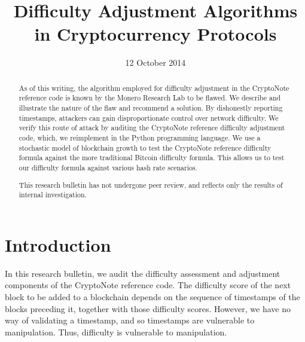\documentclass[12pt,english]{mrl}
\theoremstyle{definition}
\numberwithin{equation}{section}
\numberwithin{figure}{section}
\numberwithin{equation}{section}
\numberwithin{equation}{section}
\numberwithin{figure}{section}
\begin{document}
\begin{frontmatter}

\begin{fmbox}
\hfill\setlength{\fboxrule}{0px}\setlength{\fboxsep}{5px}
\title{Difficulty Adjustment Algorithms in Cryptocurrency Protocols}
\date{12 October 2014}
\author[
   addressref={mrl},
   email={lab@monero.cc}
]{ }
\author[
   addressref={mrl}
   email={lab@monero.cc}
]{ }


\address[id=mrl]{
}
\end{fmbox}

\begin{abstractbox}
\begin{abstract}
As of this writing, the algorithm employed for difficulty adjustment in the CryptoNote reference code is known by the Monero Research Lab to be flawed. We describe and illustrate the nature of the flaw and recommend a solution. By dishonestly reporting timestamps, attackers can gain disproportionate control over network difficulty.  We verify this route of attack by auditing the CryptoNote reference difficulty adjustment code, which, we reimplement in the Python programming language.  We use a stochastic model of blockchain growth to test the CryptoNote reference difficulty formula against the more traditional Bitcoin difficulty formula. This allows us to test our difficulty formula against various hash rate scenarios.

This research bulletin has not undergone peer review, and reflects only the results of internal investigation.
\end{abstract}
\end{abstractbox}
\end{frontmatter}

\section{Introduction}\label{intro}

In this research bulletin, we audit the difficulty assessment and adjustment components of the CryptoNote reference code. The difficulty score of the next block to be added to a blockchain depends on the sequence of timestamps of the blocks preceding it, together with those difficulty scores. However, we have no way of validating a timestamp, and so timestamps are vulnerable to manipulation. Thus, difficulty is vulnerable to manipulation.  
\end{document}
